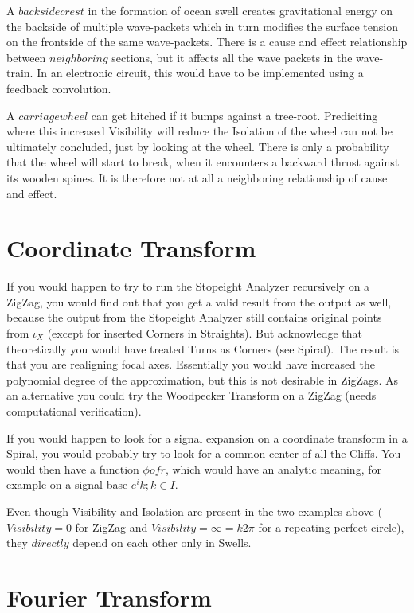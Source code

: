 \documentclass{report}
\begin{document}
A $backside crest$ in the formation of ocean swell creates gravitational energy on the backside of multiple wave-packets which in turn modifies the surface tension on the frontside of the same wave-packets. There is a cause and effect relationship between $neighboring$ sections, but it affects all the wave packets in the wave-train. In an electronic circuit, this would have to be implemented using a feedback convolution.

A $carriage wheel$ can get hitched if it bumps against a tree-root. Prediciting where this increased Visibility will reduce the Isolation of the wheel can not be ultimately concluded, just by looking at the wheel. There is only a probability that the wheel will start to break, when it encounters a backward thrust against its wooden spines. It is therefore not at all a neighboring relationship of cause and effect.

\chapter{Coordinate Transform}

If you would happen to try to run the Stopeight Analyzer recursively on a ZigZag, you would find out that you get a valid result from the output as well, because the output from the Stopeight Analyzer still contains original points from $\iota_{X}$ (except for inserted Corners in Straights). But acknowledge that theoretically you would have treated Turns as Corners (see Spiral). The result is that you are realigning focal axes. Essentially you would have increased the polynomial degree of the approximation, but this is not desirable in ZigZags. As an alternative you could try the Woodpecker Transform on a ZigZag (needs computational verification).

If you would happen to look for a signal expansion on a coordinate transform in a Spiral, you would probably try to look for a common center of all the Cliffs. You would then have a function $\phi of r$, which would have an analytic meaning, for example on a signal base $e^ik;k \in I$.

Even though Visibility and Isolation are present in the two examples above ($Visibility=0$ for ZigZag and $Visibility=\infty=k2\pi$ for a repeating perfect circle), they $directly$ depend on each other only in Swells.

\chapter{Fourier Transform}
\end{document}
